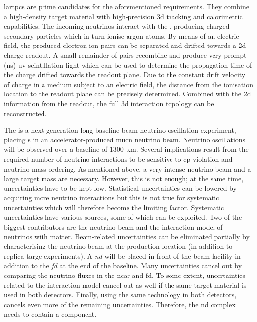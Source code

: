 \glspl{lartpc} are prime candidates for the aforementioned requirements.
They combine a high-density target material with high-precision \gls{3d} tracking and calorimetric capabilities.
The incoming neutrinos interact with the \lar{}, producing charged secondary particles which in turn ionise argon atoms.
By means of an electric field, the produced electron-ion pairs can be separated and drifted towards a \gls{2d} charge readout.
A small remainder of pairs recombine and produce very prompt (\si{\nano\second}) \gls{uv} scintillation light which can be used to determine the propagation time of the charge drifted towards the readout plane.
Due to the constant drift velocity of charge in a medium subject to an electric field, the distance from the ionisation location to the readout plane can be precisely determined.
Combined with the \gls{2d} information from the readout, the full \gls{3d} interaction topology can be reconstructed.

The \dune{} is a next generation long-baseline beam neutrino oscillation experiment, placing \lartpc{}s in an accelerator-produced muon neutrino beam.
Neutrino oscillations will be observed over a baseline of \SI{1300}{\kilo\metre}.
Several implications result from the required number of neutrino interactions to be sensitive to \gls{cp} violation and neutrino mass ordering.
As mentioned above, a very intense neutrino beam and a large target mass are necessary.
However, this is not enough; at the same time, uncertainties have to be kept low.
Statistical uncertainties can be lowered by acquiring more neutrino interactions but this is not true for systematic uncertainties which will therefore become the limiting factor.
Systematic uncertainties have various sources, some of which can be exploited.
Two of the biggest contributors are the neutrino beam and the interaction model of neutrinos with matter.
Beam-related uncertainties can be eliminated partially by characterising the neutrino beam at the production location (in addition to replica targe experiments).
A \emph{\gls{nd}} will be placed in front of the beam facility in addition to the \emph{\gls{fd}} at the end of the baseline.
Many uncertainties cancel out by comparing the neutrino fluxes in the near and \gls{fd}.
To some extent, uncertainties related to the interaction model cancel out as well if the same target material is used in both detectors.
Finally, using the same technology in both detectors, cancels even more of the remaining uncertainties.
Therefore, the \gls{nd} complex needs to contain a \lartpc{} component.

